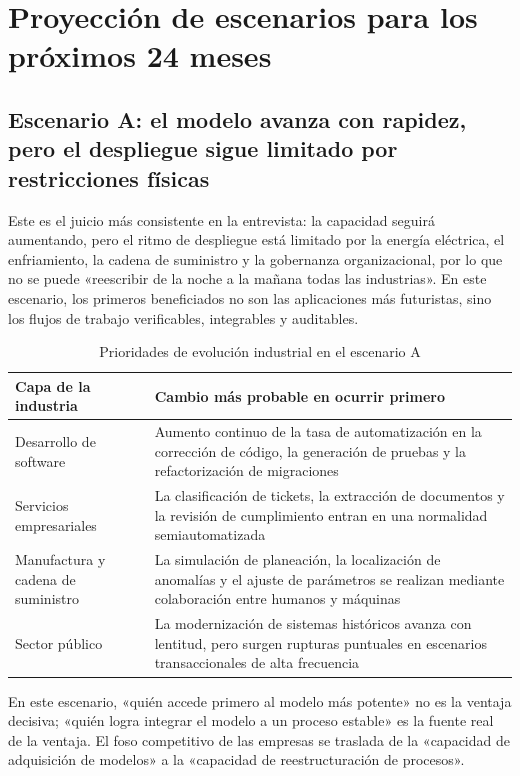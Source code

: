 \section{Proyección de escenarios para los próximos 24 meses}

\subsection{Escenario A: el modelo avanza con rapidez, pero el despliegue sigue limitado por restricciones físicas}

Este es el juicio más consistente en la entrevista: la capacidad seguirá aumentando, pero el ritmo de despliegue está limitado por la energía eléctrica, el enfriamiento, la cadena de suministro y la gobernanza organizacional, por lo que no se puede «reescribir de la noche a la mañana todas las industrias». En este escenario, los primeros beneficiados no son las aplicaciones más futuristas, sino los flujos de trabajo verificables, integrables y auditables.

\begin{table}[H]
\centering
\begin{tabular}{lp{8.8cm}}
\toprule
\textbf{Capa de la industria} & \textbf{Cambio más probable en ocurrir primero} \\
\midrule
Desarrollo de software & Aumento continuo de la tasa de automatización en la corrección de código, la generación de pruebas y la refactorización de migraciones \\
Servicios empresariales & La clasificación de tickets, la extracción de documentos y la revisión de cumplimiento entran en una normalidad semiautomatizada \\
Manufactura y cadena de suministro & La simulación de planeación, la localización de anomalías y el ajuste de parámetros se realizan mediante colaboración entre humanos y máquinas \\
Sector público & La modernización de sistemas históricos avanza con lentitud, pero surgen rupturas puntuales en escenarios transaccionales de alta frecuencia \\
\bottomrule
\end{tabular}
\caption{Prioridades de evolución industrial en el escenario A}
\end{table}

En este escenario, «quién accede primero al modelo más potente» no es la ventaja decisiva; «quién logra integrar el modelo a un proceso estable» es la fuente real de la ventaja. El foso competitivo de las empresas se traslada de la «capacidad de adquisición de modelos» a la «capacidad de reestructuración de procesos».


